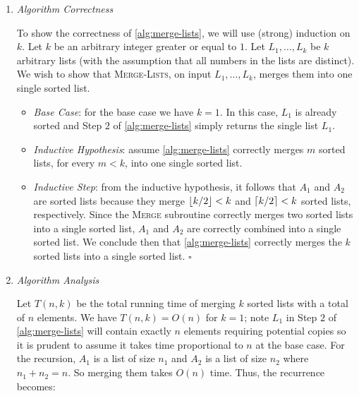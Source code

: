 \documentclass[10pt, letterpaper]{article}
\begin{document}
\begin{enumerate}[label={\bfseries Q\arabic*.}]
\begin{enumerate}
      \item
        {\itshape Algorithm Correctness} \\ \vspace{-4mm}

        To show the correctness of \autoref{alg:merge-lists}, we will use (strong) induction on $k$. Let $k$
        be an arbitrary integer greater or equal to $1$. Let $L_1, \ldots, L_k$ be $k$ arbitrary lists
        (with the assumption that all numbers in the lists are distinct). We wish to show that \textsc{Merge-Lists},
        on input $L_1, \ldots, L_k$, merges them into one single sorted list.

        \begin{itemize}[itemsep=10pt]
          \item
            {\itshape Base Case}: for the base case we have $k = 1$. In this case, $L_1$ is already sorted and
            Step $2$ of \autoref{alg:merge-lists} simply returns the single list $L_1$.

          \item
            {\itshape Inductive Hypothesis}: assume \autoref{alg:merge-lists} correctly merges $m$ sorted lists,
            for every $m < k$, into one single sorted list.

          \item
            {\itshape Inductive Step}: from the inductive hypothesis, it follows that $A_1$ and $A_2$ are sorted
            lists because they merge $\lfloor k/2 \rfloor < k$ and $\lceil k/2 \rceil < k$ sorted lists, respectively. Since the
            \textsc{Merge} subroutine correctly merges two sorted lists into a single sorted list, $A_1$ and $A_2$
            are correctly combined into a single sorted list. We conclude then that \autoref{alg:merge-lists}
            correctly merges the $k$ sorted lists into a single sorted list. \hfill $\square$
        \end{itemize}

      \item
        {\itshape Algorithm Analysis} \\ \vspace{-4mm}

        Let $T(n, k)$ be the total running time of merging $k$ sorted lists with a total of $n$ elements. We have
        $T(n, k) = O(n)$ for $k = 1$; note $L_1$ in Step $2$ of \autoref{alg:merge-lists} will contain exactly $n$
        elements requiring potential copies so it is prudent to assume it takes time proportional to $n$ at the base
        case. For the recursion, $A_1$ is a list of size $n_1$ and $A_2$ is a list of size $n_2$ where $n_1 + n_2 =
        n$. So merging them takes $O(n)$ time. Thus, the recurrence becomes:


\end{enumerate}
\end{enumerate}
\end{document}
